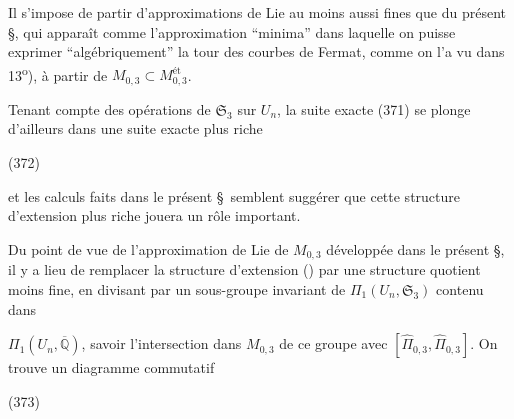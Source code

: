 
Il s'impose de partir d'approximations de Lie au moins aussi fines que  du présent \S, qui apparaît comme l'approximation ``minima'' dans laquelle on puisse exprimer ``algébriquement'' la tour des courbes de Fermat,  comme on l'a vu dans 13\textsuperscript{o}), à partir de $M_{0,3}\subset M_{0,3}^{\text{ét}}$.

Tenant compte des opérations de $\mathfrak S_3$ sur $U_n$, la suite exacte (371) se plonge d'ailleurs dans une suite exacte plus riche

\begin{samepage}
\noindent (372)
\end{samepage}

et les calculs faits dans le présent \S\ semblent suggérer que cette structure d'extension plus riche jouera un rôle important.

Du point de vue de l'approximation de Lie de $M_{0,3}$ développée dans le présent \S, il y a lieu de remplacer la structure d'extension () par une structure quotient moins fine, en divisant par un sous-groupe invariant de $\Pi_1(U_n,\mathfrak S_3)$ contenu dans


$\Pi_1(U_n,\overline{\mathbb Q})$, savoir l'intersection dans $M_{0,3}$ de ce groupe avec $[\widehat\Pi_{0,3},\widehat\Pi_{0,3}]$. On trouve un diagramme commutatif

\begin{samepage}
\noindent (373)
\end{samepage}

